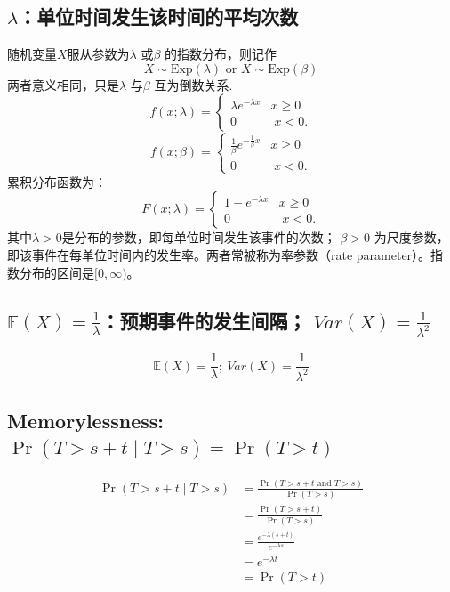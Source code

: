 \documentclass[11pt,a4paper]{article}
\begin{document}
\subsection{$\lambda$：单位时间发生该时间的平均次数}
随机变量$X$服从参数为$\lambda$ 或$\beta$ 的指数分布，则记作
$${\displaystyle X\sim {\text{Exp}}(\lambda )} \text{ or } {\displaystyle X\sim {\text{Exp}}(\beta )}$$
两者意义相同，只是$\lambda$ 与$\beta$ 互为倒数关系.
$${f(x;{\lambda})=\left\{{\begin{matrix}{\lambda }e^{-{\lambda }x}&x\geq 0\\0&\;x<0.\end{matrix}}\right.}$$
$${f(x;{\beta})=\left\{{\begin{matrix}{\frac{1}{\beta} }e^{-{\frac{1}{\beta} }x}&x\geq 0\\0&\;x<0.\end{matrix}}\right.}$$
累积分布函数为：
$${F(x;{\lambda})=\left\{{\begin{matrix}{1-}e^{-{\lambda }x}&x\geq 0\\0&\;x<0.\end{matrix}}\right.}$$
其中$\lambda > 0$是分布的参数，即每单位时间发生该事件的次数； $\beta>0$ 为尺度参数，即该事件在每单位时间内的发生率。两者常被称为率参数（rate parameter）。指数分布的区间是$[0,\infty)$。

\subsection{$\mathbb{E}(X)=\frac{1}{\lambda}$：预期事件的发生间隔； $Var(X)=\frac{1}{\lambda^2}$}
$$\mathbb{E}(X)=\frac{1}{\lambda};\ Var(X)=\frac{1}{\lambda^2}$$
\subsection{Memorylessness: ${\displaystyle \Pr \left(T>s+t\mid T>s\right)=\Pr(T>t)}$}
\begin{equation}
    \begin{aligned}
        \Pr (T>s+t\mid T>s)&=\frac{\Pr(T>s+t\text{ and }T>s)}{\Pr(T>s)}\\
        &=\frac{\Pr(T>s+t)}{\Pr(T>s)}\\
        &=\frac{e^{-\lambda(s+t)}}{e^{-\lambda s}}\\
        &=e^{-\lambda t}\\
        &=\Pr (T>t)
    \end{aligned}
    \nonumber
\end{equation}
\end{document}
